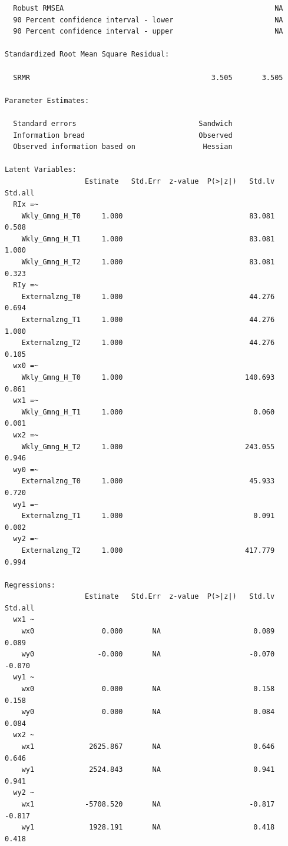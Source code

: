 \documentclass{article}
\begin{document}
\begin{verbatim}
  Robust RMSEA                                                  NA
  90 Percent confidence interval - lower                        NA
  90 Percent confidence interval - upper                        NA

Standardized Root Mean Square Residual:

  SRMR                                           3.505       3.505

Parameter Estimates:

  Standard errors                             Sandwich
  Information bread                           Observed
  Observed information based on                Hessian

Latent Variables:
                   Estimate   Std.Err  z-value  P(>|z|)   Std.lv  Std.all
  RIx =~                                                                 
    Wkly_Gmng_H_T0     1.000                              83.081    0.508
    Wkly_Gmng_H_T1     1.000                              83.081    1.000
    Wkly_Gmng_H_T2     1.000                              83.081    0.323
  RIy =~                                                                 
    Externalzng_T0     1.000                              44.276    0.694
    Externalzng_T1     1.000                              44.276    1.000
    Externalzng_T2     1.000                              44.276    0.105
  wx0 =~                                                                 
    Wkly_Gmng_H_T0     1.000                             140.693    0.861
  wx1 =~                                                                 
    Wkly_Gmng_H_T1     1.000                               0.060    0.001
  wx2 =~                                                                 
    Wkly_Gmng_H_T2     1.000                             243.055    0.946
  wy0 =~                                                                 
    Externalzng_T0     1.000                              45.933    0.720
  wy1 =~                                                                 
    Externalzng_T1     1.000                               0.091    0.002
  wy2 =~                                                                 
    Externalzng_T2     1.000                             417.779    0.994

Regressions:
                   Estimate   Std.Err  z-value  P(>|z|)   Std.lv  Std.all
  wx1 ~                                                                  
    wx0                0.000       NA                      0.089    0.089
    wy0               -0.000       NA                     -0.070   -0.070
  wy1 ~                                                                  
    wx0                0.000       NA                      0.158    0.158
    wy0                0.000       NA                      0.084    0.084
  wx2 ~                                                                  
    wx1             2625.867       NA                      0.646    0.646
    wy1             2524.843       NA                      0.941    0.941
  wy2 ~                                                                  
    wx1            -5708.520       NA                     -0.817   -0.817
    wy1             1928.191       NA                      0.418    0.418


\end{verbatim}
\end{document}
